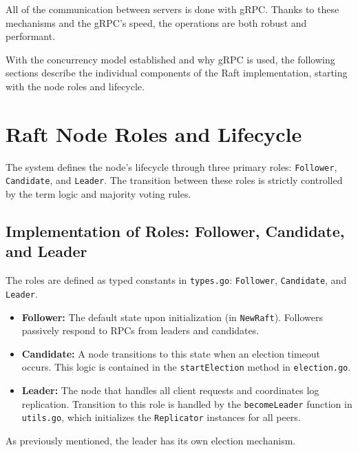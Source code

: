 \documentclass[shortabstract]{iithesis}
\begin{document}
All of the communication between servers is done with gRPC. Thanks to these mechanisms and the gRPC's speed, the operations are both robust and performant.

With the concurrency model established and why gRPC is used, the following sections describe the individual components of the Raft implementation, starting with the node roles and lifecycle.

\section{Raft Node Roles and Lifecycle}
The system defines the node's lifecycle through three primary roles: \texttt{Follower}, \texttt{Candidate}, and \texttt{Leader}. The transition between these roles is strictly controlled by the term logic and majority voting rules.

\subsection{Implementation of Roles: Follower, Candidate, and Leader}

The roles are defined as typed constants in \texttt{types.go}: \texttt{Follower}, \texttt{Candidate}, and \texttt{Leader}.
\begin{itemize}
    \item \textbf{Follower:} The default state upon initialization (in \texttt{NewRaft}). Followers passively respond to RPCs from leaders and candidates.
    \item \textbf{Candidate:} A node transitions to this state when an election timeout occurs. This logic is contained in the \texttt{startElection} method in \texttt{election.go}.
    \item \textbf{Leader:} The node that handles all client requests and coordinates log replication. Transition to this role is handled by the \texttt{becomeLeader} function in \texttt{utils.go}, which initializes the \texttt{Replicator} instances for all peers.
\end{itemize}

As previously mentioned, the leader has its own election mechanism.
\end{document}
